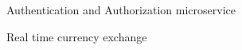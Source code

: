 

\begin{cventries}

  \cventry
    {} %
    {Authentication and Authorization microservice} %
    {} %
    {} %
    {}

  \cventry
    {} %
    {Real time currency exchange} %
    {} %
    {} %
    {}

\end{cventries}

